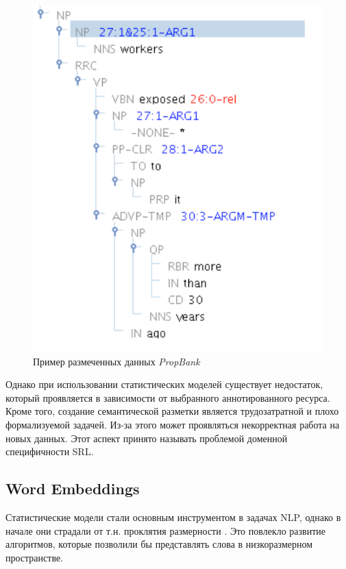 \begin{figure}[t]
\centering
\includegraphics[scale=0.45]{img/redrelex.png}
\caption{\label{fig:redrelex}Пример размеченных данных \emph{PropBank}}
\end{figure}

Однако при использовании статистических моделей существует недостаток, который проявляется в зависимости от выбранного аннотированного ресурса. Кроме того, создание семантической разметки является трудозатратной и плохо формализуемой задачей. Из-за этого может проявляться некорректная работа на новых данных. Этот аспект принято называть проблемой доменной специфичности SRL.

\subsection{Word Embeddings}

Статистические модели стали основным инструментом в задачах NLP, однако в начале они страдали от т.н. проклятия размерности \autocite{bellman1957dynamic}. Это повлекло развитие алгоритмов, которые позволили бы представлять слова в низкоразмерном пространстве.

